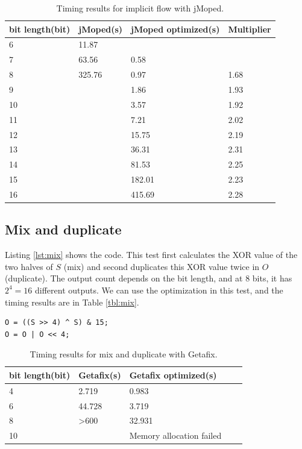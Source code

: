 \begin{table}[!h]
\begin{center}
\begin{tabular}{|l|l|l|l|}
\hline
bit length(bit) & jMoped(s) & jMoped optimized(s) & Multiplier \\ \hline
6 & 11.87 &  &  \\ \hline
7 & 63.56 & 0.58 &  \\ \hline
8 & 325.76 & 0.97 & 1.68 \\ \hline
9 &  & 1.86 & 1.93 \\ \hline
10 &  & 3.57 & 1.92 \\ \hline
11 &  & 7.21 & 2.02 \\ \hline
12 &  & 15.75 & 2.19 \\ \hline
13 &  & 36.31 & 2.31 \\ \hline
14 &  & 81.53 & 2.25 \\ \hline
15 &  & 182.01 & 2.23 \\ \hline
16 &  & 415.69 & 2.28 \\ \hline
\end{tabular}
\end{center}
\caption{Timing results for implicit flow with jMoped.}
\label{tbl:implicitJ}
\end{table}


\subsection{Mix and duplicate}
Listing \ref{lst:mix} shows the code. This test first calculates the XOR value of the two halves of $S$ (mix) and second duplicates this XOR value twice in $O$ (duplicate). The output count depends on the bit length, and at $8$ bits, it has $2^{4} = 16$ different outputs. We can use the optimization in this test, and the timing results are in Table \ref{tbl:mix}.

\lstset{language=C}  
\begin{lstlisting}[float=!h, caption={Mix and duplicate test program at 8 bits.},label=lst:mix]
O = ((S >> 4) ^ S) & 15;
O = O | O << 4;
\end{lstlisting}

\begin{table}[!h]
\centering
\begin{tabular}{|l|l|l|l|l|}
\hline
{bit length(bit)} & Getafix(s) & {Getafix optimized(s)} \\ \hline
4 & {2.719} & 0.983  \\ \hline
6 & {44.728} & 3.719 \\ \hline
8 & \textgreater 600 & 32.931 \\ \hline
10 &  & {Memory allocation failed}  \\ \hline
\end{tabular}
\caption{Timing results for mix and duplicate with Getafix.}
\label{tbl:mixG}
\end{table}

